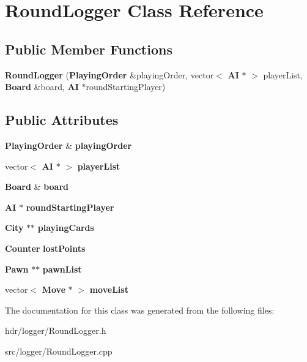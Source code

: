 \section{Round\-Logger Class Reference}
\label{class_round_logger}
\subsection*{Public Member Functions}
\begin{DoxyCompactItemize}
\item 
{\bfseries Round\-Logger} ({\bf Playing\-Order} \&playing\-Order, vector$<$ {\bf A\-I} $\ast$ $>$ player\-List, {\bf Board} \&board, {\bf A\-I} $\ast$round\-Starting\-Player)\label{class_round_logger_a972ed6c65096d153c4777dc8de7dbd4f}

\end{DoxyCompactItemize}
\subsection*{Public Attributes}
\begin{DoxyCompactItemize}
\item 
{\bf Playing\-Order} \& {\bfseries playing\-Order}\label{class_round_logger_a7fd0f9fd826753aa3715ba85e863ab3f}

\item 
vector$<$ {\bf A\-I} $\ast$ $>$ {\bfseries player\-List}\label{class_round_logger_a9fe62f7b37b012bcde14640da24ea485}

\item 
{\bf Board} \& {\bfseries board}\label{class_round_logger_a256a2d63cc85c71f8a57268b1829e6df}

\item 
{\bf A\-I} $\ast$ {\bfseries round\-Starting\-Player}\label{class_round_logger_adfb669d859b3e9e1bd18a8ae1a31cf6b}

\item 
{\bf City} $\ast$$\ast$ {\bfseries playing\-Cards}\label{class_round_logger_a4e30b0c6cf75d64dd8c3af86e240e188}

\item 
{\bf Counter} {\bfseries lost\-Points}\label{class_round_logger_a48257ec06504aa78fc89fe943d06aca8}

\item 
{\bf Pawn} $\ast$$\ast$ {\bfseries pawn\-List}\label{class_round_logger_a3ba92d778f19c90572cfa6d7df0dcd5f}

\item 
vector$<$ {\bf Move} $\ast$ $>$ {\bfseries move\-List}\label{class_round_logger_a2dd45e93684f28897866e57303f7824b}

\end{DoxyCompactItemize}


The documentation for this class was generated from the following files\-:\begin{DoxyCompactItemize}
\item 
hdr/logger/Round\-Logger.\-h\item 
src/logger/Round\-Logger.\-cpp\end{DoxyCompactItemize}
